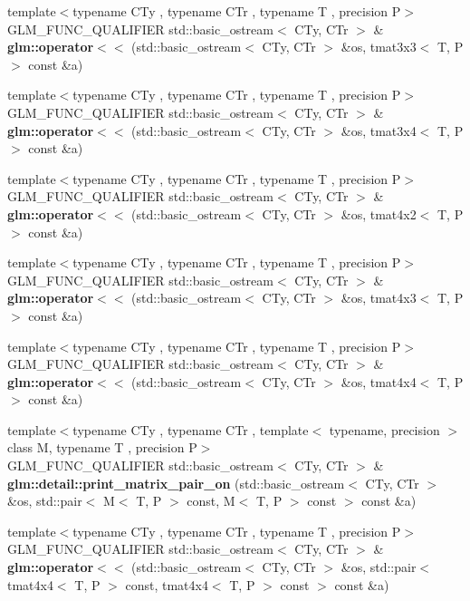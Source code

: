 \begin{DoxyCompactItemize}
{\footnotesize template$<$typename C\+Ty , typename C\+Tr , typename T , precision P$>$ }\\G\+L\+M\+\_\+\+F\+U\+N\+C\+\_\+\+Q\+U\+A\+L\+I\+F\+I\+ER std\+::basic\+\_\+ostream$<$ C\+Ty, C\+Tr $>$ \& {\bfseries glm\+::operator$<$$<$} (std\+::basic\+\_\+ostream$<$ C\+Ty, C\+Tr $>$ \&os, tmat3x3$<$ T, P $>$ const \&a)
\item 
{\footnotesize template$<$typename C\+Ty , typename C\+Tr , typename T , precision P$>$ }\\G\+L\+M\+\_\+\+F\+U\+N\+C\+\_\+\+Q\+U\+A\+L\+I\+F\+I\+ER std\+::basic\+\_\+ostream$<$ C\+Ty, C\+Tr $>$ \& {\bfseries glm\+::operator$<$$<$} (std\+::basic\+\_\+ostream$<$ C\+Ty, C\+Tr $>$ \&os, tmat3x4$<$ T, P $>$ const \&a)
\item 
{\footnotesize template$<$typename C\+Ty , typename C\+Tr , typename T , precision P$>$ }\\G\+L\+M\+\_\+\+F\+U\+N\+C\+\_\+\+Q\+U\+A\+L\+I\+F\+I\+ER std\+::basic\+\_\+ostream$<$ C\+Ty, C\+Tr $>$ \& {\bfseries glm\+::operator$<$$<$} (std\+::basic\+\_\+ostream$<$ C\+Ty, C\+Tr $>$ \&os, tmat4x2$<$ T, P $>$ const \&a)
\item 
{\footnotesize template$<$typename C\+Ty , typename C\+Tr , typename T , precision P$>$ }\\G\+L\+M\+\_\+\+F\+U\+N\+C\+\_\+\+Q\+U\+A\+L\+I\+F\+I\+ER std\+::basic\+\_\+ostream$<$ C\+Ty, C\+Tr $>$ \& {\bfseries glm\+::operator$<$$<$} (std\+::basic\+\_\+ostream$<$ C\+Ty, C\+Tr $>$ \&os, tmat4x3$<$ T, P $>$ const \&a)
\item 
{\footnotesize template$<$typename C\+Ty , typename C\+Tr , typename T , precision P$>$ }\\G\+L\+M\+\_\+\+F\+U\+N\+C\+\_\+\+Q\+U\+A\+L\+I\+F\+I\+ER std\+::basic\+\_\+ostream$<$ C\+Ty, C\+Tr $>$ \& {\bfseries glm\+::operator$<$$<$} (std\+::basic\+\_\+ostream$<$ C\+Ty, C\+Tr $>$ \&os, tmat4x4$<$ T, P $>$ const \&a)
\item 
\mbox{\label{io_8inl_aff6c8f1c43115431bf40167f6638b78f}} 
{\footnotesize template$<$typename C\+Ty , typename C\+Tr , template$<$ typename, precision $>$ class M, typename T , precision P$>$ }\\G\+L\+M\+\_\+\+F\+U\+N\+C\+\_\+\+Q\+U\+A\+L\+I\+F\+I\+ER std\+::basic\+\_\+ostream$<$ C\+Ty, C\+Tr $>$ \& {\bfseries glm\+::detail\+::print\+\_\+matrix\+\_\+pair\+\_\+on} (std\+::basic\+\_\+ostream$<$ C\+Ty, C\+Tr $>$ \&os, std\+::pair$<$ M$<$ T, P $>$ const, M$<$ T, P $>$ const $>$ const \&a)
\item 
{\footnotesize template$<$typename C\+Ty , typename C\+Tr , typename T , precision P$>$ }\\G\+L\+M\+\_\+\+F\+U\+N\+C\+\_\+\+Q\+U\+A\+L\+I\+F\+I\+ER std\+::basic\+\_\+ostream$<$ C\+Ty, C\+Tr $>$ \& {\bfseries glm\+::operator$<$$<$} (std\+::basic\+\_\+ostream$<$ C\+Ty, C\+Tr $>$ \&os, std\+::pair$<$ tmat4x4$<$ T, P $>$ const, tmat4x4$<$ T, P $>$ const $>$ const \&a)
\end{DoxyCompactItemize}


